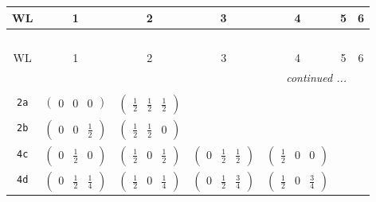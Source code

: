 \documentclass[fleqn,9pt,landscape]{jsarticle}
\begin{document}
\begin{center}
\renewcommand{\arraystretch}{1.2}
\begin{longtable}{ccccccc}
 \hline \hline
WL & 1 & 2 & 3 & 4 & 5 & 6 \\ \hline \endfirsthead

\multicolumn{6}{l}{\tablename\ \thetable{}} \\
 \hline \hline
WL & 1 & 2 & 3 & 4 & 5 & 6 \\ \hline \endhead

 \hline \hline
\multicolumn{6}{r}{\footnotesize\it continued ...} \\ \endfoot

 \hline \hline
\multicolumn{6}{r}{} \\ \endlastfoot

{\tt 2a} & $ \begin{pmatrix} 0 & 0 & 0 \end{pmatrix} $ & $ \begin{pmatrix} \frac{1}{2} & \frac{1}{2} & \frac{1}{2} \end{pmatrix} $ & $  $ & $  $ & $  $ & $  $ \\ \hline
{\tt 2b} & $ \begin{pmatrix} 0 & 0 & \frac{1}{2} \end{pmatrix} $ & $ \begin{pmatrix} \frac{1}{2} & \frac{1}{2} & 0 \end{pmatrix} $ & $  $ & $  $ & $  $ & $  $ \\ \hline
{\tt 4c} & $ \begin{pmatrix} 0 & \frac{1}{2} & 0 \end{pmatrix} $ & $ \begin{pmatrix} \frac{1}{2} & 0 & \frac{1}{2} \end{pmatrix} $ & $ \begin{pmatrix} 0 & \frac{1}{2} & \frac{1}{2} \end{pmatrix} $ & $ \begin{pmatrix} \frac{1}{2} & 0 & 0 \end{pmatrix} $ & $  $ & $  $ \\ \hline
{\tt 4d} & $ \begin{pmatrix} 0 & \frac{1}{2} & \frac{1}{4} \end{pmatrix} $ & $ \begin{pmatrix} \frac{1}{2} & 0 & \frac{1}{4} \end{pmatrix} $ & $ \begin{pmatrix} 0 & \frac{1}{2} & \frac{3}{4} \end{pmatrix} $ & $ \begin{pmatrix} \frac{1}{2} & 0 & \frac{3}{4} \end{pmatrix} $ & $  $ & $  $ \\ \hline

\end{longtable}
\end{center}
\end{document}

